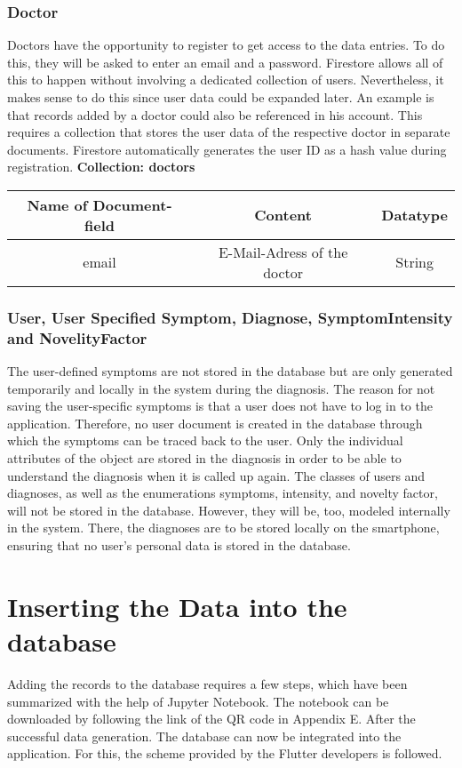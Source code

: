 \subsubsection{Doctor}
Doctors have the opportunity to register to get access to the data entries. To do this, they will be asked to enter an email and a password. Firestore allows all of this to happen without involving a dedicated collection of users. Nevertheless, it makes sense to do this since user data could be expanded later. An example is that records added by a doctor could also be referenced in his account. This requires a collection that stores the user data of the respective doctor in separate documents. Firestore automatically generates the user ID as a hash value during registration.
\textbf{Collection: doctors}
\begin{center}
	\begin{tabular}{ | c| c| c | } 
		\hline
		Name of Document-field& Content & Datatype \\  
		\hline
		email & E-Mail-Adress of the doctor & String \\
		\hline
	\end{tabular}
\end{center}
\subsubsection{User, User Specified Symptom, Diagnose, SymptomIntensity and NovelityFactor}
The user-defined symptoms are not stored in the database but are only generated temporarily and locally in the system during the diagnosis. The reason for not saving the user-specific symptoms is that a user does not have to log in to the application. Therefore, no user document is created in the database through which the symptoms can be traced back to the user. Only the individual attributes of the object are stored in the diagnosis in order to be able to understand the diagnosis when it is called up again. The classes of users and diagnoses, as well as the enumerations symptoms, intensity, and novelty factor, will not be stored in the database. However, they will be, too, modeled internally in the system. There, the diagnoses are to be stored locally on the smartphone, ensuring that no user's personal data is stored in the database.

\section{Inserting the Data into the database}
Adding the records to the database requires a few steps, which have been summarized with the help of Jupyter Notebook. The notebook can be downloaded by following the link of the QR code in Appendix E. After the successful data generation. The database can now be integrated into the application. For this, the scheme provided by the Flutter developers is followed.